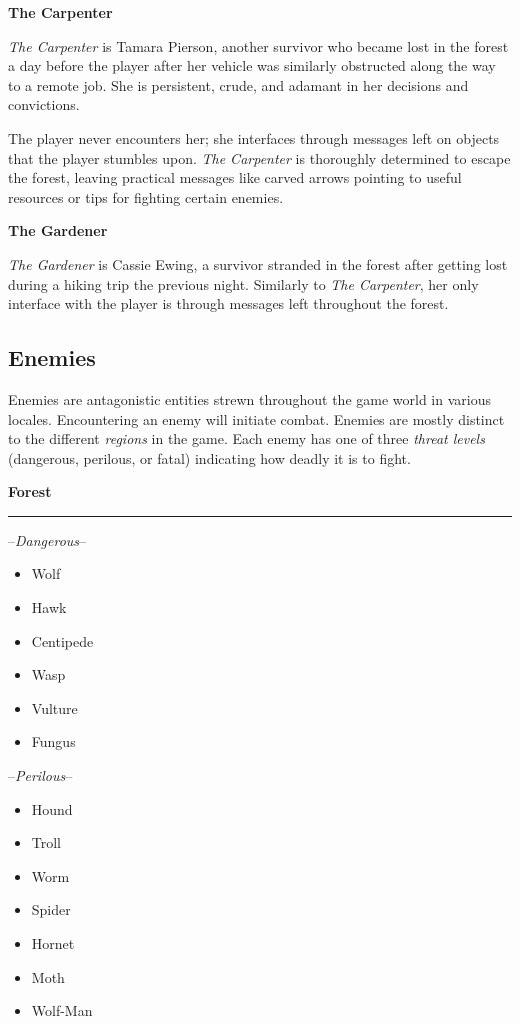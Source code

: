 \documentclass[11pt]{article}
\begin{document}
	\textbf{The Carpenter}
	\newline
	
	\textit{The Carpenter} is Tamara Pierson, another survivor who became lost in the forest a day before the player after her vehicle was similarly obstructed along the way to a remote job. She is persistent, crude, and adamant in her decisions and convictions.
	
	The player never encounters her; she interfaces through messages left on objects that the player stumbles upon. \textit{The Carpenter} is thoroughly determined to escape the forest, leaving practical messages like carved arrows pointing to useful resources or tips for fighting certain enemies.
	
	\textbf{The Gardener}
	\newline
	
	\textit{The Gardener} is Cassie Ewing, a survivor stranded in the forest after getting lost during a hiking trip the previous night. Similarly to \textit{The Carpenter}, her only interface with the player is through messages left throughout the forest.
	
	\subsection{Enemies}
	
	Enemies are antagonistic entities strewn throughout the game world in various locales. Encountering an enemy will initiate combat. Enemies are mostly distinct to the different \textit{regions} in the game. Each enemy has one of three \textit{threat levels} (dangerous, perilous, or fatal) indicating how deadly it is to fight.\newline
	
	\textbf{Forest}
	\newline
	\rule{\textwidth}{0.4pt}
	
	--\textit{Dangerous}--
	\begin{itemize}
		\item Wolf
		\item Hawk
		\item Centipede
		\item Wasp
		\item Vulture
		\item Fungus
	\end{itemize}

	--\textit{Perilous}--
	\begin{itemize}
		\item Hound
		\item Troll
		\item Worm
		\item Spider
		\item Hornet
		\item Moth
		\item Wolf-Man
	\end{itemize}
\end{document}
